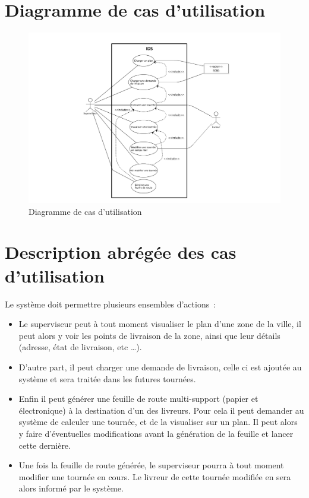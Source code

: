 \pagebreak
\section{Diagramme de cas d’utilisation}

\begin{figure}[h]
    \centering
    \includegraphics[width=140mm]{../diagrams/use_case/use_case_diagram.png}
    \caption{Diagramme de cas d’utilisation}
    \label{diagram:use_case}
\end{figure}

\section{Description abr\'eg\'ee des cas d’utilisation}

Le système doit permettre plusieurs ensembles d’actions~:

\begin{itemize}
    \item Le superviseur peut à tout moment visualiser le plan d’une zone de la ville, il peut alors y voir les
    points de livraison de la zone, ainsi que leur détails (adresse, état de livraison, etc …).

    \item D’autre part, il peut charger une demande de livraison, celle ci est ajoutée au système et sera traitée
    dans les futures tournées.

    \item Enfin il peut générer une feuille de route multi-support (papier et électronique) à la destination d’un
    des livreurs. Pour cela il peut demander au système de calculer une tournée, et de la visualiser sur un plan.
    Il peut alors y faire d’éventuelles modifications avant la génération de la feuille et lancer cette dernière.

    \item Une fois la feuille de route générée, le superviseur pourra à tout moment modifier une tournée en cours.
    Le livreur de cette tournée modifiée en sera alors informé par le système.
\end{itemize}

